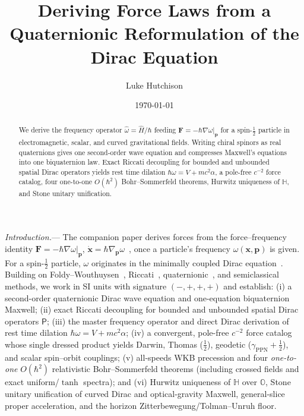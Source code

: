 \documentclass[aps,prl,reprint,superscriptaddress,nofootinbib,floatfix]{revtex4-2}
\theoremstyle{prlthm}
\newcommand{\prlsec}[1]{\par\smallskip\noindent\emph{#1.}---}
\begin{document}
\title{Deriving Force Laws from a Quaternionic Reformulation of the Dirac Equation}
\newif\ifanonymous \anonymousfalse %
\newcommand{\companionauthor}{\ifanonymous Anonymous\else L.~Hutchison\fi}
\ifanonymous\else\author{Luke Hutchison}
\noaffiliation\fi
\date{\today}

\begin{abstract}
We derive the frequency operator $\hat{\omega}=\hat{H}/\hbar$ feeding $\mathbf{F}=-\hbar\nabla\omega|_{\mathbf{p}}$ for a spin-$\tfrac{1}{2}$ particle in electromagnetic, scalar, and curved gravitational fields. Writing chiral spinors as real quaternions gives one second-order wave equation and compresses Maxwell's equations into one biquaternion law. Exact Riccati decoupling for bounded and unbounded spatial Dirac operators yields rest time dilation $\hbar\omega=V+mc^2\alpha$, a pole-free $c^{-2}$ force catalog, four one-to-one $O(\hbar^2)$ Bohr--Sommerfeld theorems, Hurwitz uniqueness of $\mathbb{H}$, and Stone unitary unification.
\end{abstract}

\maketitle

\prlsec{Introduction}
The companion paper derives forces from the force--frequency identity $\mathbf{F}=-\hbar\nabla\omega|_{\mathbf{p}}$, $\dot{\mathbf{x}}=\hbar\nabla_{\mathbf{p}}\omega$~\citep{HutchisonSGM2026}, once a particle's frequency $\omega(\mathbf{x},\mathbf{p})$ is given. For a spin-$\tfrac{1}{2}$ particle, $\omega$ originates in the minimally coupled Dirac equation~\citep{Dirac1928Quantum}. Building on Foldy--Wouthuysen~\citep{Foldy1950Dirac,Eriksen1958Foldy,HehlNi1990Inertial,ObukhovSilenkoTeryaev2011Dirac}, Riccati~\citep{Heully1986Diagonalisation}, quaternionic~\citep{Lanczos1929Tensoranalytischen,FeynmanGellMann1958Theory,Hestenes1967Real}, and semiclassical~\citep{BolteKeppeler1999Semiclassical,Keppeler2003Semiclassical,BeckerFujiieWittsten2025Bohr} methods, we work in SI units with signature $(-,+,+,+)$ and establish: (i) a second-order quaternionic Dirac wave equation and one-equation biquaternion Maxwell; (ii) exact Riccati decoupling for bounded and unbounded spatial Dirac operators $\mathsf{P}$; (iii) the master frequency operator and direct Dirac derivation of rest time dilation $\hbar\omega=V+mc^2\alpha$; (iv) a convergent, pole-free $c^{-2}$ force catalog whose single dressed product yields Darwin, Thomas ($\tfrac{1}{2}$), geodetic ($\gamma_\text{PPN}+\tfrac{1}{2}$), and scalar spin--orbit couplings; (v) all-speeds WKB precession and four \emph{one-to-one} $O(\hbar^2)$ relativistic Bohr--Sommerfeld theorems (including crossed fields and exact uniform/$\tanh$ spectra); and (vi) Hurwitz uniqueness of $\mathbb{H}$ over $\mathbb{O}$, Stone unitary unification of curved Dirac and optical-gravity Maxwell, general-slice proper acceleration, and the horizon Zitterbewegung/Tolman--Unruh floor.
\end{document}
